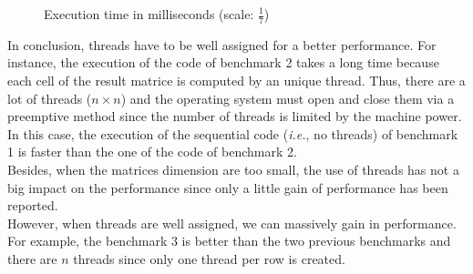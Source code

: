 \documentclass[]{article}
\begin{document}
\begin{figure}[h]
\centering
{}
\caption{Execution time in milliseconds (scale: $\frac{1}{7}$)}
\end{figure}









In conclusion, threads have to be well assigned for a better performance. For instance, the execution of
the code of benchmark 2 takes a long time because each cell of the result matrice is computed by an
unique thread. Thus, there are a lot of threads ($n\times n$) and the operating system must open and close them
via a preemptive method since the number of threads is limited by the machine power.
In this case, the execution of the sequential code
(\emph{i.e.}, no threads) of benchmark 1 is faster than the one of the code of benchmark 2.
~\\

Besides, when the matrices dimension are too small, the use of threads has not a big impact on the performance since
only a little gain of performance has been reported.
~\\

However, when threads are well assigned, we can massively gain in performance. For example, the benchmark 3 is better than the
two previous benchmarks and there are $n$ threads since only one thread per row is created.
~\\
\end{document}
